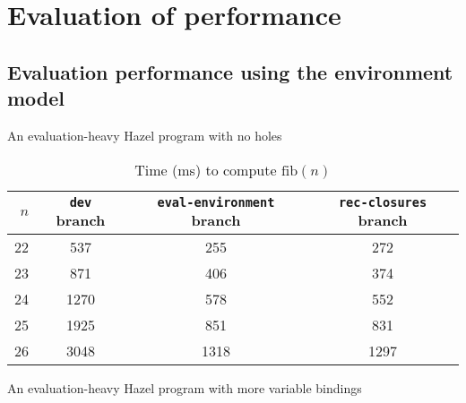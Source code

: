 \chapter{Evaluation of performance}
\label{sec:evaluation}

\section{Evaluation performance using the environment model}
\label{sec:evaluation-evalenv}


\begin{listing}
  \caption{An evaluation-heavy Hazel program with no holes}
  \label{fig:perf-fib}
\end{listing}

\begin{singlespace}
  \begin{table}
    \centering
    \begin{tabular}{r|ccc}
      \hline
      $n$ & \texttt{dev} branch & \texttt{eval-environment} branch & \texttt{rec-closures} branch \\
      \hline\hline
      22 & 537 & 255 & 272 \\
      23 & 871 & 406 & 374 \\
      24 & 1270 & 578 & 552 \\
      25 & 1925 & 851 & 831 \\
      26 & 3048 & 1318 & 1297 \\
      \hline\hline
    \end{tabular}
    \caption{Time (ms) to compute $\text{fib}(n)$}
    \label{tab:perf-fib}
  \end{table}
\end{singlespace}


\begin{listing}
  \caption{An evaluation-heavy Hazel program with more variable bindings}
  \label{fig:perf-fib-more-bindings}
\end{listing}

